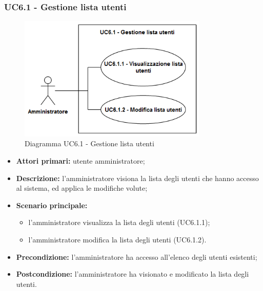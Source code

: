 \subsubsection{UC6.1 - Gestione lista utenti}
	\begin{figure}[H]
		\centering
		\includegraphics[width=9cm]{images/UC6.1.png}
		\caption{Diagramma UC6.1 - Gestione lista utenti}
	\end{figure}
	\begin{itemize}
		\item \textbf{Attori primari:} utente amministratore;
		\item \textbf{Descrizione:} l'amministratore visiona la lista degli utenti che hanno accesso al sistema, ed applica le modifiche volute;
		\item \textbf{Scenario principale:} 
			\begin{itemize}
				\item l'amministratore visualizza la lista degli utenti (UC6.1.1);
				\item l'amministratore modifica la lista degli utenti (UC6.1.2).
			\end{itemize}
		\item \textbf{Precondizione:} l'amministratore ha accesso all'elenco degli utenti esistenti;
		\item \textbf{Postcondizione:} l'amministratore ha visionato e modificato la lista degli utenti.
	\end{itemize}


